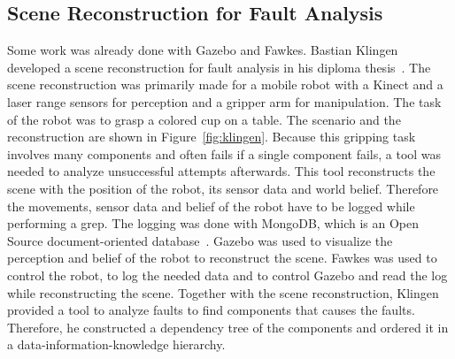 \subsection{Scene Reconstruction for Fault Analysis}
Some work was already done with Gazebo and Fawkes. Bastian Klingen developed a scene reconstruction for fault analysis in his diploma thesis~\cite{KlingenDA}. The scene reconstruction was primarily made for a mobile robot with a Kinect and a laser range sensors for perception and a gripper arm for manipulation. The task of the robot was to grasp a colored cup on a table. The scenario and the reconstruction are shown in Figure~\ref{fig:klingen}. Because this gripping task involves many components and often fails if a single component fails, a tool was needed to analyze unsuccessful attempts afterwards. This tool reconstructs the scene with the position of the robot, its sensor data and world belief. Therefore the movements, sensor data and belief of the robot have to be logged while performing a grep. The logging was done with MongoDB, which is an Open Source document-oriented database~\cite{mongodb}. Gazebo was used to visualize the perception and belief of the robot to reconstruct the scene. Fawkes was used to control the robot, to log the needed data and to control Gazebo and read the log while reconstructing the scene. Together with the scene reconstruction, Klingen provided a tool to analyze faults to find components that causes the faults. Therefore, he constructed a dependency tree of the components and ordered it in a data-information-knowledge hierarchy.\\
